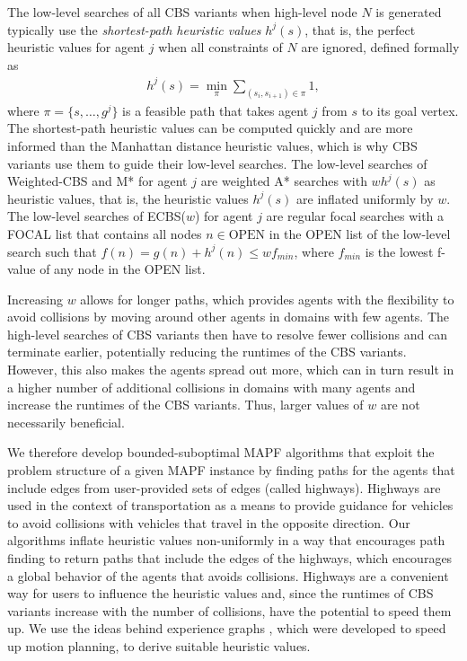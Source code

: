 \documentclass[letterpaper]{article}
\theoremstyle{definition}
\newcommand{\open}{\mbox{OPEN}\xspace}
\newcommand{\focal}{\mbox{FOCAL}\xspace}
\begin{document}
The low-level searches of all CBS variants when high-level node $N$ is
generated typically use the \emph{shortest-path heuristic values} $h^j(s)$,
that is, the perfect heuristic values for agent $j$ when all constraints of
$N$ are ignored, defined formally as { \small
\begin{align*}
\label{eq:h_def}
h^j(s) = \min_{\pi} \sum_{(s_i,s_{i+1}) \in \pi} 1,
\end{align*}
} where $\pi = \{ s, \ldots, g^j \}$ is a feasible path that takes agent $j$
from $s$ to its goal vertex. The shortest-path heuristic values can be
computed quickly and are more informed than the Manhattan distance heuristic
values, which is why CBS variants use them to guide their low-level
searches. The low-level searches of Weighted-CBS and M* for agent $j$ are
weighted A* searches with $w h^j(s)$ as heuristic values, that is, the
heuristic values $h^j(s)$ are inflated uniformly by $w$. The low-level
searches of ECBS($w$) for agent $j$ are regular focal searches with a \focal
list that contains all nodes $n \in \open$ in the \open list of the low-level
search such that $f(n) = g(n) + h^j(n) \leq w f_{min}$, where $f_{min}$ is the
lowest f-value of any node in the \open list.

Increasing $w$ allows for longer paths, which provides agents with the
flexibility to avoid collisions by moving around other agents in domains with
few agents. The high-level searches of CBS variants then have to resolve fewer
collisions and can terminate earlier, potentially reducing the runtimes of the
CBS variants. However, this also makes the agents spread out more, which can
in turn result in a higher number of additional collisions in domains with
many agents and increase the runtimes of the CBS variants. Thus, larger values
of $w$ are not necessarily beneficial.

We therefore develop bounded-suboptimal MAPF algorithms that exploit the
problem structure of a given MAPF instance by finding paths for the agents
that include edges from user-provided sets of edges (called highways).
Highways are used in the context of transportation as a means to provide
guidance for vehicles to avoid collisions with vehicles that travel in the
opposite direction.  Our algorithms inflate heuristic values non-uniformly in
a way that encourages path finding to return paths that include the edges of
the highways, which encourages a global behavior of the agents that avoids
collisions. Highways are a convenient way for users to influence the heuristic
values and, since the runtimes of CBS variants increase with the number of
collisions, have the potential to speed them up. We use the ideas behind
experience graphs \cite{PCCL:RSS:12}, which were developed to speed up motion
planning, to derive suitable heuristic values.
\end{document}
